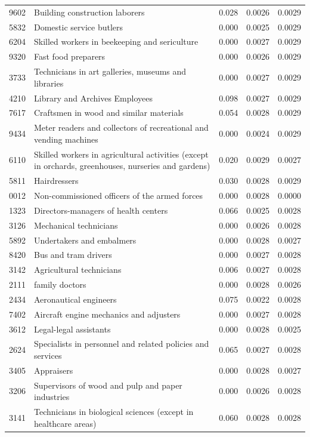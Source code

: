 \begin{longtable}{p{}>{\raggedright\arraybackslash}p{}rrr}
9602 & Building construction laborers & 0.028 & 0.0026 & 0.0029 \\
5832 & Domestic service butlers & 0.000 & 0.0025 & 0.0029 \\
6204 & Skilled workers in beekeeping and sericulture & 0.000 & 0.0027 & 0.0029 \\
9320 & Fast food preparers & 0.000 & 0.0026 & 0.0029 \\
3733 & Technicians in art galleries, museums and libraries & 0.000 & 0.0027 & 0.0029 \\
4210 & Library and Archives Employees & 0.098 & 0.0027 & 0.0029 \\
7617 & Craftsmen in wood and similar materials & 0.054 & 0.0028 & 0.0029 \\
9434 & Meter readers and collectors of recreational and vending machines & 0.000 & 0.0024 & 0.0029 \\
6110 & Skilled workers in agricultural activities (except in orchards, greenhouses, nurseries and gardens) & 0.020 & 0.0029 & 0.0027 \\
5811 & Hairdressers & 0.030 & 0.0028 & 0.0029 \\
0012 & Non-commissioned officers of the armed forces & 0.000 & 0.0028 & 0.0000 \\
1323 & Directors-managers of health centers & 0.066 & 0.0025 & 0.0028 \\
3126 & Mechanical technicians & 0.000 & 0.0026 & 0.0028 \\
5892 & Undertakers and embalmers & 0.000 & 0.0028 & 0.0027 \\
8420 & Bus and tram drivers & 0.000 & 0.0027 & 0.0028 \\
3142 & Agricultural technicians & 0.006 & 0.0027 & 0.0028 \\
2111 & family doctors & 0.000 & 0.0028 & 0.0026 \\
2434 & Aeronautical engineers & 0.075 & 0.0022 & 0.0028 \\
7402 & Aircraft engine mechanics and adjusters & 0.000 & 0.0027 & 0.0028 \\
3612 & Legal-legal assistants & 0.000 & 0.0028 & 0.0025 \\
2624 & Specialists in personnel and related policies and services & 0.065 & 0.0027 & 0.0028 \\
3405 & Appraisers & 0.000 & 0.0028 & 0.0027 \\
3206 & Supervisors of wood and pulp and paper industries & 0.000 & 0.0026 & 0.0028 \\
3141 & Technicians in biological sciences (except in healthcare areas) & 0.060 & 0.0028 & 0.0028 \\

\end{longtable}
